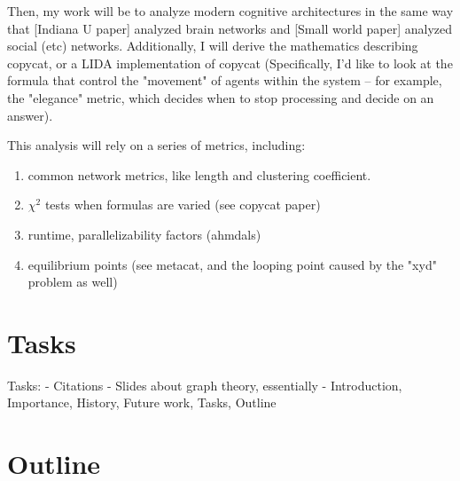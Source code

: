 \documentclass{nature}
\begin{document}
    Then, my work will be to analyze modern cognitive architectures in the same way that [Indiana U paper] analyzed brain networks and [Small world paper] analyzed social (etc) networks. 
    Additionally, I will derive the mathematics describing copycat, or a LIDA implementation of copycat (Specifically, I'd like to look at the formula that control the "movement" of agents within the system -- for example, the "elegance" metric, which decides when to stop processing and decide on an answer). 

    This analysis will rely on a series of metrics, including:
    \begin{enumerate}
        \item common network metrics, like length and clustering coefficient.
        \item $\chi ^2$ tests when formulas are varied (see copycat paper)
        \item runtime, parallelizability factors (ahmdals)
        \item equilibrium points (see metacat, and the looping point caused by the "xyd" problem as well)
    \end{enumerate}


\section{Tasks}

Tasks:
 - Citations
 - Slides about graph theory, essentially
 - Introduction, Importance, History, Future work, Tasks, Outline

\section{Outline}
\end{document}
